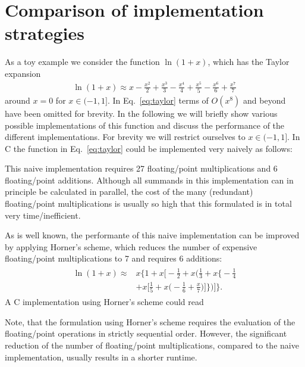 \documentclass[10pt,DIV16,twocolumn,numbers=noenddot]{scrartcl}
\begin{document}
\section{Comparison of implementation strategies}
\label{sec:toymodel}

As a toy example we consider the function $\ln(1+x)$, which has the
Taylor expansion
%
\begin{align}
  \ln(1+x) \approx x - \frac{x^2}{2} + \frac{x^3}{3} - \frac{x^4}{4} + \frac{x^5}{5} - \frac{x^6}{6} + \frac{x^7}{7}
  \label{eq:taylor}
\end{align}
%
around $x=0$ for $x\in(-1,1]$.  In Eq.~\eqref{eq:taylor} terms of
$O(x^8)$ and beyond have been omitted for brevity.  In the following
we will briefly show various possible implementations of this function
and discuss the performance of the different implementations.  For
brevity we will restrict ourselves to $x\in(-1,1]$.  In C the function
in Eq.~\eqref{eq:taylor} could be implemented very naively as follows:
%

%
This naive implementation requires 27 floating\-/point multiplications
and 6 floating\-/point additions.  Although all summands in this
implementation can in principle be calculated in parallel, the cost of
the many (redundant) floating\-/point multiplications is usually so
high that this formulated is in total very time\-/inefficient.

As is well known, the performante of this naive implementation can be
improved by applying Horner's scheme, which reduces the number of
expensive floating\-/point multiplications to 7 and requires 6
additions:
%
\begin{align}
\begin{split}
  \ln(1+x) \approx{}& x \bigg\{1 + x \bigg[-\frac{1}{2} + x \bigg(\frac{1}{3} + x \bigg\{-\frac{1}{4} \\
  &+ x \bigg[\frac{1}{5} + x\bigg(-\frac{1}{6} + \frac{x}{7}\bigg)\bigg]\bigg\}\bigg)\bigg]\bigg\}.
\end{split}\label{eq:horner}%
\end{align}
%
A C implementation using Horner's scheme could read
%

%
Note, that the formulation using Horner's scheme requires the
evaluation of the floating\-/point operations in strictly sequential
order.  However, the significant reduction of the number of
floating\-/point multiplications, compared to the naive
implementation, usually results in a shorter runtime.
\end{document}
